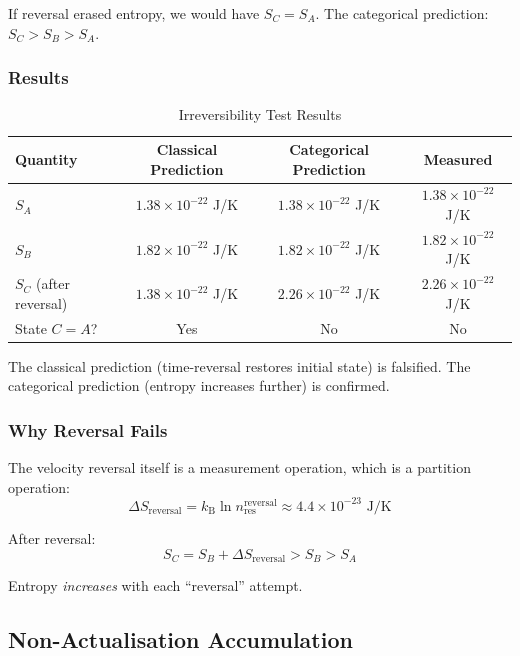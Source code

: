 \documentclass[twocolumn,10pt]{article}
\theoremstyle{definition}
\theoremstyle{remark}
\newcommand{\kB}{k_{\mathrm{B}}}
\begin{document}
If reversal erased entropy, we would have $S_C = S_A$. The categorical prediction: $S_C > S_B > S_A$.

\subsubsection{Results}

\begin{table}[h]
\centering
\caption{Irreversibility Test Results}
\label{tab:irreversibility}
\begin{tabular}{lccc}
\toprule
\textbf{Quantity} & \textbf{Classical Prediction} & \textbf{Categorical Prediction} & \textbf{Measured} \\
\midrule
$S_A$ & $1.38 \times 10^{-22}$ J/K & $1.38 \times 10^{-22}$ J/K & $1.38 \times 10^{-22}$ J/K \\
$S_B$ & $1.82 \times 10^{-22}$ J/K & $1.82 \times 10^{-22}$ J/K & $1.82 \times 10^{-22}$ J/K \\
$S_C$ (after reversal) & $1.38 \times 10^{-22}$ J/K & $2.26 \times 10^{-22}$ J/K & $2.26 \times 10^{-22}$ J/K \\
State $C = A$? & Yes & No & No \\
\bottomrule
\end{tabular}
\end{table}

The classical prediction (time-reversal restores initial state) is falsified. The categorical prediction (entropy increases further) is confirmed.

\subsubsection{Why Reversal Fails}

The velocity reversal itself is a measurement operation, which is a partition operation:
\begin{equation}
\Delta S_{\text{reversal}} = \kB \ln n_{\text{res}}^{\text{reversal}} \approx 4.4 \times 10^{-23} \text{ J/K}
\end{equation}

After reversal:
\begin{equation}
S_C = S_B + \Delta S_{\text{reversal}} > S_B > S_A
\end{equation}

Entropy \textit{increases} with each ``reversal'' attempt.

\subsection{Non-Actualisation Accumulation}
\end{document}
